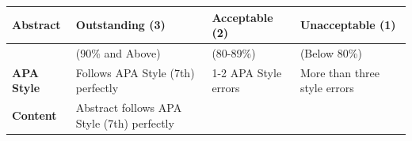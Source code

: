 \documentclass[
  openany]{book}
\begin{document}
\begin{longtable}[]{@{}llll@{}}
\toprule
\begin{minipage}[b]{0.22\columnwidth}\raggedright
Abstract\strut
\end{minipage} & \begin{minipage}[b]{0.22\columnwidth}\raggedright
Outstanding (3)\strut
\end{minipage} & \begin{minipage}[b]{0.22\columnwidth}\raggedright
Acceptable (2)\strut
\end{minipage} & \begin{minipage}[b]{0.22\columnwidth}\raggedright
Unacceptable (1)\strut
\end{minipage}\tabularnewline
\midrule
\endhead
\begin{minipage}[t]{0.22\columnwidth}\raggedright
\strut
\end{minipage} & \begin{minipage}[t]{0.22\columnwidth}\raggedright
(90\% and Above)\strut
\end{minipage} & \begin{minipage}[t]{0.22\columnwidth}\raggedright
(80-89\%)\strut
\end{minipage} & \begin{minipage}[t]{0.22\columnwidth}\raggedright
(Below 80\%)\strut
\end{minipage}\tabularnewline
\begin{minipage}[t]{0.22\columnwidth}\raggedright
\textbf{APA Style}\strut
\end{minipage} & \begin{minipage}[t]{0.22\columnwidth}\raggedright
Follows APA Style (7th) perfectly\strut
\end{minipage} & \begin{minipage}[t]{0.22\columnwidth}\raggedright
1-2 APA Style errors\strut
\end{minipage} & \begin{minipage}[t]{0.22\columnwidth}\raggedright
More than three style errors\strut
\end{minipage}\tabularnewline
\begin{minipage}[t]{0.22\columnwidth}\raggedright
\textbf{Content}\strut
\end{minipage} & \begin{minipage}[t]{0.22\columnwidth}\raggedright
Abstract follows APA Style (7th) perfectly\strut
\end{minipage} & \begin{minipage}[t]{0.22\columnwidth}\raggedright

\end{minipage}
\end{longtable}
\end{document}
